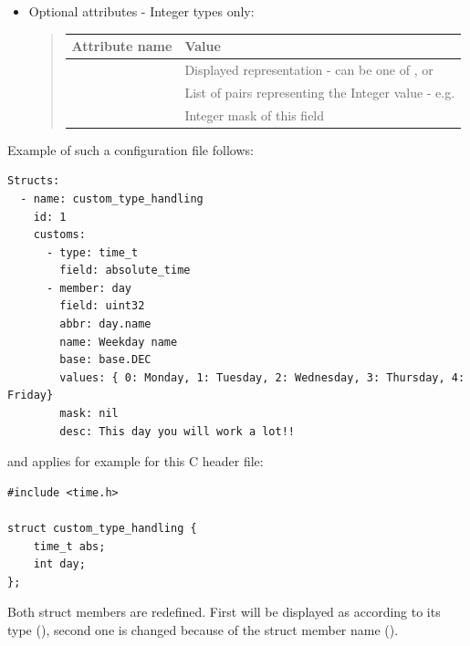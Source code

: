 \documentclass[A4paper,10pt,english]{sphinxmanual}
\begin{document}
\label{user/config:below}\begin{itemize}
\item {} 
Optional attributes - Integer types only:
\begin{quote}

\begin{tabulary}{\linewidth}{|L|L|}
\hline
\textbf{
Attribute name
} & \textbf{
Value
}\\\hline

 & 
Displayed representation - can be one of ,  or 
\\\hline

 & 
List of  pairs representing the Integer value - e.g. 
\\\hline

 & 
Integer mask of this field
\\\hline
\end{tabulary}

\end{quote}

\end{itemize}

Example of such a configuration file follows:

\begin{Verbatim}[commandchars=\\\{\}]
Structs:
  - name: custom_type_handling
    id: 1
    customs:
      - type: time_t
        field: absolute_time
      - member: day
        field: uint32
        abbr: day.name
        name: Weekday name
        base: base.DEC
        values: { 0: Monday, 1: Tuesday, 2: Wednesday, 3: Thursday, 4: Friday}
        mask: nil
        desc: This day you will work a lot!!
\end{Verbatim}

and applies for example for this C header file:

\begin{Verbatim}[commandchars=\\\{\}]
#include <time.h>

struct custom_type_handling {
    time_t abs;
    int day;
};
\end{Verbatim}

Both struct members are redefined. First will be displayed as  according to its type (), second one is changed because of the struct member name ().
\end{document}
